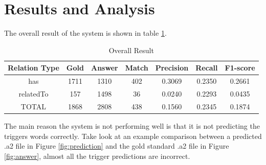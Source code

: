 \section{Results and Analysis}
The overall result of the system is shown in table \ref{table:overall_result}. 
\begin{table}[h]
	\caption{Overall Result}
	\centering
	\label{table:overall_result}
	\begin{tabular}{|c | c c |c c c c |}
		\hline 
		{Relation Type} 
		& Gold & Answer  & Match  & Precision & Recall & F1-score\\ 
		\hline
		has  & 1711 & 1310 & 402 & 0.3069 & 0.2350 & 0.2661 \\
		
		relatedTo & 157 & 1498 &  36 & 0.0240 & 0.2293 & 0.0435\\
		\hline 
		TOTAL  & 1868 & 2808 & 438 & 0.1560 & 0.2345 & 0.1874 \\
		\hline 
	\end{tabular}
\end{table}
The main reason the system is not performing well is that it is not predicting the triggers words correctly. Take look at an example comparison between a predicted .a2 file in Figure \ref{fig:prediction} and the gold standard .a2 file in Figure \ref{fig:answer}, almost all the trigger predictions are incorrect.
